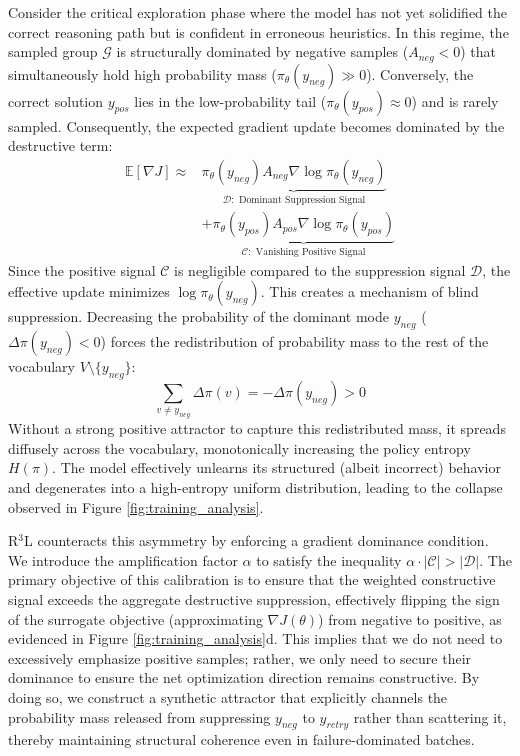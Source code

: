\documentclass[11pt]{article}
\begin{document}
Consider the critical exploration phase where the model has not yet solidified the correct reasoning path but is confident in erroneous heuristics. In this regime, the sampled group $\mathcal{G}$ is structurally dominated by negative samples ($A_{neg} < 0$) that simultaneously hold high probability mass ($\pi_\theta(y_{neg}) \gg 0$). Conversely, the correct solution $y_{pos}$ lies in the low-probability tail ($\pi_\theta(y_{pos}) \approx 0$) and is rarely sampled. Consequently, the expected gradient update becomes dominated by the destructive term:
\begin{equation}
\begin{split}
\mathbb{E}[\nabla J] \approx &\underbrace{\pi_\theta(y_{neg}) A_{neg} \nabla \log \pi_\theta(y_{neg})}_{\mathcal{D}: \text{ Dominant Suppression Signal}} \\
&+ \underbrace{\pi_\theta(y_{pos}) A_{pos} \nabla \log \pi_\theta(y_{pos})}_{\mathcal{C}: \text{ Vanishing Positive Signal}}
\end{split}
\end{equation}
Since the positive signal $\mathcal{C}$ is negligible compared to the suppression signal $\mathcal{D}$, the effective update minimizes $\log \pi_\theta(y_{neg})$. This creates a mechanism of blind suppression. Decreasing the probability of the dominant mode $y_{neg}$ ($\Delta \pi(y_{neg}) < 0$) forces the redistribution of probability mass to the rest of the vocabulary $V \setminus \{y_{neg}\}$:
\begin{equation}
\sum_{v \neq y_{neg}} \Delta \pi(v) = - \Delta \pi(y_{neg}) > 0
\end{equation}
Without a strong positive attractor to capture this redistributed mass, it spreads diffusely across the vocabulary, monotonically increasing the policy entropy $H(\pi)$. The model effectively unlearns its structured (albeit incorrect) behavior and degenerates into a high-entropy uniform distribution, leading to the collapse observed in Figure \ref{fig:training_analysis}.

R$^3$L counteracts this asymmetry by enforcing a gradient dominance condition. We introduce the amplification factor $\alpha$ to satisfy the inequality $\alpha \cdot |\mathcal{C}| > |\mathcal{D}|$. The primary objective of this calibration is to ensure that the weighted constructive signal exceeds the aggregate destructive suppression, effectively flipping the sign of the surrogate objective (approximating $\nabla J(\theta)$) from negative to positive, as evidenced in Figure \ref{fig:training_analysis}d. This implies that we do not need to excessively emphasize positive samples; rather, we only need to secure their dominance to ensure the net optimization direction remains constructive. By doing so, we construct a synthetic attractor that explicitly channels the probability mass released from suppressing $y_{neg}$ to $y_{retry}$ rather than scattering it, thereby maintaining structural coherence even in failure-dominated batches.
\end{document}
